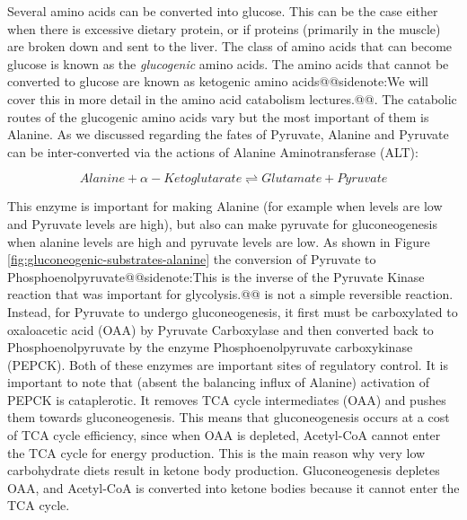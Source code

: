 \documentclass{tufte-handout}
\makeatletter
\def\sidenote#1{@@sidenote:#1@@}
\makeatother
\begin{document}
Several amino acids can be converted into glucose.  This can be the case either when there is excessive dietary protein, or if proteins (primarily in the muscle) are broken down and sent to the liver.  The class of amino acids that can become glucose is known as the \emph{glucogenic} amino acids.  The amino acids that cannot be converted to glucose are known as ketogenic amino acids\sidenote{We will cover this in more detail in the amino acid catabolism lectures.}.  The catabolic routes of the glucogenic amino acids vary but the most important of them is Alanine. As we discussed regarding the fates of Pyruvate, Alanine and Pyruvate can be inter-converted via the actions of Alanine Aminotransferase (ALT):


\begin{equation}\label{eq:alt}
Alanine + \alpha - Ketoglutarate \rightleftharpoons Glutamate + Pyruvate
\end{equation}

This enzyme is important for making Alanine (for example when levels are low and Pyruvate levels are high), but also can make pyruvate for gluconeogenesis when alanine levels are high and pyruvate levels are low.  As shown in Figure \ref{fig:gluconeogenic-substrates-alanine} the conversion of Pyruvate to Phosphoenolpyruvate\sidenote{This is the inverse of the Pyruvate Kinase reaction that was important for glycolysis.} is not a simple reversible reaction.  Instead, for Pyruvate to undergo gluconeogenesis, it first must be carboxylated to oxaloacetic acid (OAA) by Pyruvate Carboxylase and then converted back to Phosphoenolpyruvate by the enzyme Phosphoenolpyruvate carboxykinase (PEPCK).  Both of these enzymes are important sites of regulatory control. It is important to note that (absent the balancing influx of Alanine) activation of PEPCK is cataplerotic.  It removes TCA cycle intermediates (OAA) and pushes them towards gluconeogenesis.  This means that gluconeogenesis occurs at a cost of TCA cycle efficiency, since when OAA is depleted, Acetyl-CoA cannot enter the TCA cycle for energy production.  This is the main reason why very low carbohydrate diets result in ketone body production.  Gluconeogenesis depletes OAA, and Acetyl-CoA is converted into ketone bodies because it cannot enter the TCA cycle.
\end{document}
